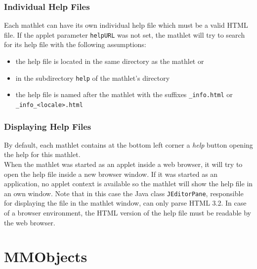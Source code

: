 \documentclass[a4paper,12pt]{book}
\begin{document}
  \subsection{Individual Help Files}
  Each mathlet can have its own individual help file which must be a valid HTML file.
  If the applet parameter \verb|helpURL| was not set, the mathlet will try to search for its 
  help file with the following assumptions:
  \begin{itemize}
    \item the help file is located in the same directory as the mathlet or 
    \item in the subdirectory \verb|help| of the mathlet's directory
    \item the help file is named after the mathlet with the suffixes \verb|_info.html| or 
    \verb|_info_<locale>.html|
  \end{itemize}
  
  
  \subsection{Displaying Help Files}
  By default, each mathlet contains at the bottom left corner a {\it help} button opening
  the help for this mathlet.\\
  When the mathlet was started as an applet inside a web browser, it will try to
  open the help file inside a new browser window. If it was started as an application, no
  applet context is available so the mathlet will show the help file in an own window.
  Note that in this case the Java class \verb|JEditorPane|, responsible for displaying the file in the
  mathlet window, can only parse HTML 3.2. In case of a browser environment, the HTML version
  of the help file must be readable by the web browser.
  
  

\clearpage

\clearpage


  
\chapter{MMObjects}
\end{document}
